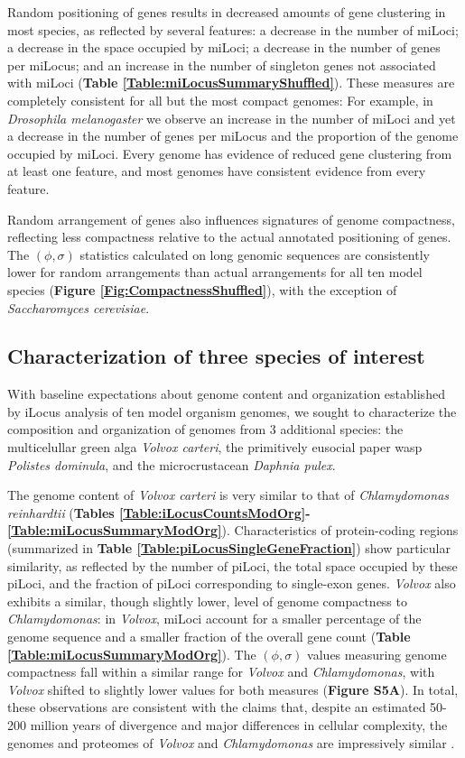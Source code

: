 Random positioning of genes results in decreased amounts of gene clustering in most species, as reflected by several features: a decrease in the number of miLoci; a decrease in the space occupied by miLoci; a decrease in the number of genes per miLocus; and an increase in the number of singleton genes not associated with miLoci (\textbf{Table \ref{Table:miLocusSummaryShuffled}}).
These measures are completely consistent for all but the most compact genomes:
For example, in \textit{Drosophila melanogaster} we observe an increase in the number of miLoci and yet a decrease in the number of genes per miLocus and the proportion of the genome occupied by miLoci.
Every genome has evidence of reduced gene clustering from at least one feature, and most genomes have consistent evidence from every feature.

Random arrangement of genes also influences signatures of genome compactness, reflecting less compactness relative to the actual annotated positioning of genes.
The $(\phi, \sigma)$ statistics calculated on long genomic sequences are consistently lower for random arrangements than actual arrangements for all ten model species (\textbf{Figure \ref{Fig:CompactnessShuffled}}), with the exception of \textit{Saccharomyces cerevisiae}.

\subsection{Characterization of three species of interest}

With baseline expectations about genome content and organization established by iLocus analysis of ten model organism genomes, we sought to characterize the composition and organization of genomes from 3 additional species: the multicelullar green alga \textit{Volvox carteri}, the primitively eusocial paper wasp \textit{Polistes dominula}, and the microcrustacean \textit{Daphnia pulex}.

The genome content of \textit{Volvox carteri} is very similar to that of \textit{Chlamydomonas reinhardtii} (\textbf{Tables \ref{Table:iLocusCountsModOrg}-\ref{Table:miLocusSummaryModOrg}}).
Characteristics of protein-coding regions (summarized in \textbf{Table \ref{Table:piLocusSingleGeneFraction}}) show particular similarity, as reflected by the number of piLoci, the total space occupied by these piLoci, and the fraction of piLoci corresponding to single-exon genes.
\textit{Volvox} also exhibits a similar, though slightly lower, level of genome compactness to \textit{Chlamydomonas}:
in \textit{Volvox}, miLoci account for a smaller percentage of the genome sequence and a smaller fraction of the overall gene count (\textbf{Table \ref{Table:miLocusSummaryModOrg}}).
The $(\phi, \sigma)$ values measuring genome compactness fall within a similar range for \textit{Volvox} and \textit{Chlamydomonas}, with \textit{Volvox} shifted to slightly lower values for both measures (\textbf{Figure S5A}).
In total, these observations are consistent with the claims that, despite an estimated 50-200 million years of divergence and major differences in cellular complexity, the genomes and proteomes of \textit{Volvox} and \textit{Chlamydomonas} are impressively similar \cite{VolvoxGenome}.

